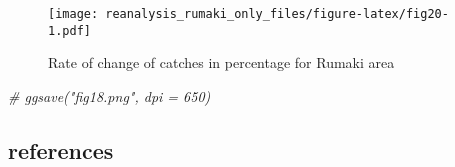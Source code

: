 \documentclass[
]{article}
\newenvironment{Shaded}{\begin{snugshade}}{\end{snugshade}}
\newcommand{\CommentTok}[1]{\textcolor[rgb]{0.56,0.35,0.01}{\textit{#1}}}
\begin{document}
\begin{figure}
\centering
\texttt{[image: reanalysis\_rumaki\_only\_files/figure-latex/fig20-1.pdf]}
\caption{\label{fig:fig20}Rate of change of catches in percentage for Rumaki area}
\end{figure}

\begin{Shaded}
\begin{Highlighting}[]
\CommentTok{# ggsave("fig18.png", dpi = 650)}
\end{Highlighting}
\end{Shaded}

\hypertarget{references}{%
\subsection{references}\label{references}}
\end{document}
